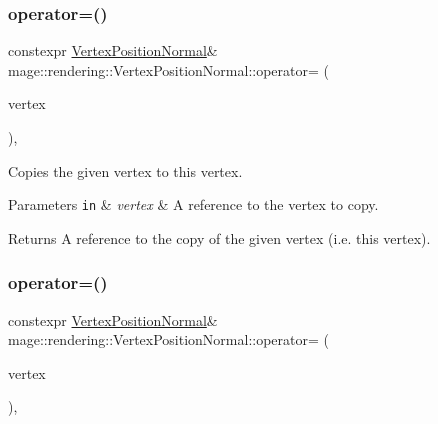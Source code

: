 \subsubsection{\texorpdfstring{operator=()}{operator=()}\hspace{0.1cm}{\footnotesize\ttfamily [1/2]}}
{\footnotesize\ttfamily constexpr \hyperlink{structmage_1_1rendering_1_1_vertex_position_normal}{Vertex\+Position\+Normal}\& mage\+::rendering\+::\+Vertex\+Position\+Normal\+::operator= (\begin{DoxyParamCaption}\item[{const \hyperlink{structmage_1_1rendering_1_1_vertex_position_normal}{Vertex\+Position\+Normal} \&}]{vertex }\end{DoxyParamCaption})\hspace{0.3cm}{\ttfamily [default]}, {\ttfamily [noexcept]}}

Copies the given vertex to this vertex.


\begin{DoxyParams}[1]{Parameters}
\mbox{\tt in}  & {\em vertex} & A reference to the vertex to copy. \\
\hline
\end{DoxyParams}
\begin{DoxyReturn}{Returns}
A reference to the copy of the given vertex (i.\+e. this vertex). 
\end{DoxyReturn}
\hypertarget{structmage_1_1rendering_1_1_vertex_position_normal_ab91c35523dc03eb777f572853b4be633}{}\label{structmage_1_1rendering_1_1_vertex_position_normal_ab91c35523dc03eb777f572853b4be633} 
\subsubsection{\texorpdfstring{operator=()}{operator=()}\hspace{0.1cm}{\footnotesize\ttfamily [2/2]}}
{\footnotesize\ttfamily constexpr \hyperlink{structmage_1_1rendering_1_1_vertex_position_normal}{Vertex\+Position\+Normal}\& mage\+::rendering\+::\+Vertex\+Position\+Normal\+::operator= (\begin{DoxyParamCaption}\item[{\hyperlink{structmage_1_1rendering_1_1_vertex_position_normal}{Vertex\+Position\+Normal} \&\&}]{vertex }\end{DoxyParamCaption})\hspace{0.3cm}{\ttfamily [default]}, {\ttfamily [noexcept]}}


